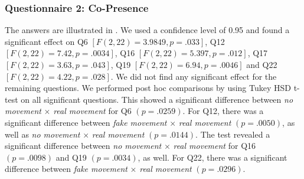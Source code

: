 \documentclass[english,runningheads,a4paper]{llncs}[2018/03/10]
\begin{document}
\subsubsection{Questionnaire 2: Co-Presence}
The answers are illustrated in .
We used a confidence level of 0.95 and found a significant effect on Q6 $[F(2, 22) = 3.9849, p = .033]$, Q12 $[F(2, 22) = 7.42, p = .0034]$, Q16 $[F(2, 22) = 5.397, p = .012]$, Q17 $[F(2, 22) = 3.63, p = .043]$, Q19 $[F(2, 22) = 6.94, p = .0046]$ and Q22 $[F(2, 22) = 4.22, p = .028]$.
We did not find any significant effect for the remaining questions. 
We performed post hoc comparisons by using Tukey HSD t-test on all significant questions. 
This showed a significant difference between \textit{no movement} $ \times $ \textit{real movement} for Q6 $(p = .0259)$. 
For Q12, there was a significant difference between \textit{fake movement} $\times $ \textit{real movement}  $(p = .0050)$, as well as \textit{no movement} $\times $ \textit{real movement}  $(p = .0144)$.
The test revealed a significant difference between \textit{no movement} $ \times $ \textit{real movement} for Q16 $(p = .0098)$ and Q19 $(p = .0034)$, as well. 
For Q22, there was a significant difference between \textit{fake movement} $ \times $ \textit{real movement} $(p = .0296)$.
\end{document}
